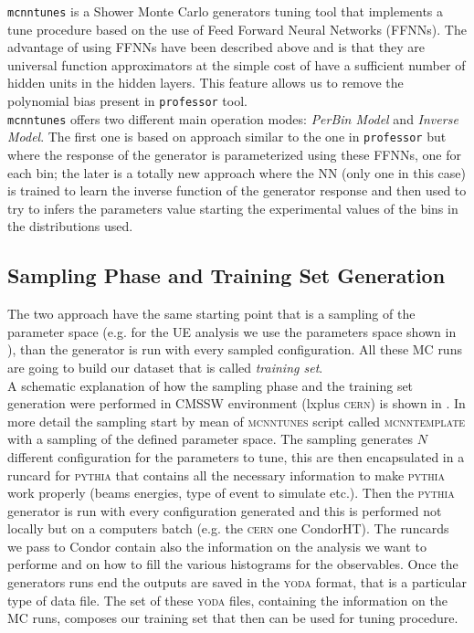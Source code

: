 \texttt{mcnntunes} \cite{MCNNTUNESarticle} is a Shower Monte Carlo generators tuning tool that implements a tune procedure based on the use of Feed Forward Neural Networks (FFNNs). The advantage of using FFNNs have been described above and is that they are universal function approximators at the simple cost of have a sufficient number of hidden units in the hidden layers. This feature allows us to remove the polynomial bias present in \texttt{professor} tool.
\\
\texttt{mcnntunes} offers two different main operation modes: \textit{PerBin Model} and \textit{Inverse Model}. The first one is based on approach similar to the one in \texttt{professor} but where the response of the generator is parameterized using these FFNNs, one for each bin; the later is a totally new approach where the NN (only one in this case) is trained to learn the inverse function of the generator response and then used to try to infers the parameters value starting the experimental values of the bins in the distributions used.
\\

\medskip

\subsection{Sampling Phase and Training Set Generation}

The two approach have the same starting point that is a sampling of the parameter space (e.g. for the UE analysis we use the parameters space shown in ), than the generator is run with every sampled configuration. 
All these MC runs are going to build our dataset that is called \textit{training set}.
\\
A schematic explanation of how the sampling phase and the training set generation were performed in CMSSW environment (lxplus \textsc{cern}) is shown in . 
In more detail the sampling start by mean of \textsc{mcnntunes} script called \textsc{mcnntemplate} with a sampling of the defined parameter space. The sampling generates  $N$ different configuration for the parameters to tune, this are then encapsulated in a runcard for \textsc{pythia} that contains all the necessary information to make \textsc{pythia} work properly (beams energies, type of event to simulate etc.). Then the \textsc{pythia} generator is run with every configuration generated and this is performed not locally but on a computers batch (e.g. the \textsc{cern} one CondorHT). The runcards we pass to Condor contain also the information on the analysis we want to performe and on how to fill the various histograms for the observables. Once the generators runs end the outputs are saved in the \textsc{yoda} format, that is a particular type of data file. The set of these \textsc{yoda} files, containing the information on the MC runs, composes our training set that then can be used for tuning procedure.

